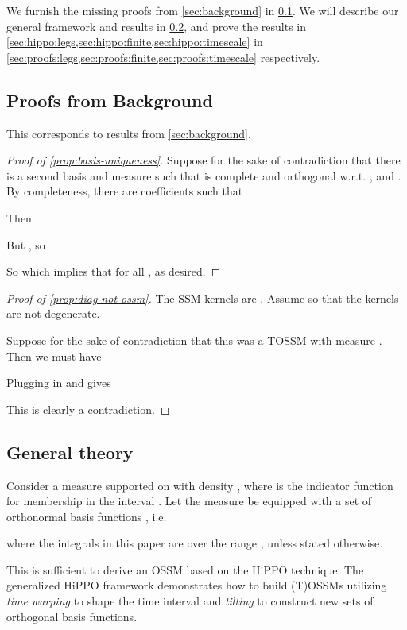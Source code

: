 \documentclass{article}
\begin{document}
We furnish the missing proofs from \cref{sec:background} in \cref{sec:proofs:background}.
We will describe our general framework and results in \cref{sec:proofs:general}, and prove the results in \cref{sec:hippo:legs,sec:hippo:finite,sec:hippo:timescale}
in \cref{sec:proofs:legs,sec:proofs:finite,sec:proofs:timescale} respectively.

\subsection{Proofs from Background}
\label{sec:proofs:background}

This corresponds to results from \cref{sec:background}.

\begin{proof}[Proof of \cref{prop:basis-uniqueness}]Suppose for the sake of contradiction that there is a second basis and measure  such that  is complete and orthogonal w.r.t. , and .
  By completeness, there are coefficients  such that
  
  Then
  
  But , so
  
  So  which implies that  for all , as desired.
\end{proof}

\begin{proof}[Proof of \cref{prop:diag-not-ossm}]The SSM kernels are . Assume  so that the kernels are not degenerate.

  Suppose for the sake of contradiction that this was a TOSSM with measure .
  Then we must have
  
  Plugging in  and  gives
  
  This is clearly a contradiction.
\end{proof}


\subsection{General theory}
\label{sec:proofs:general}



Consider a measure supported on  with density , where  is the indicator function for membership in the  interval . Let the measure be equipped with a set of orthonormal basis functions , i.e.

where the integrals in this paper are over the range , unless stated otherwise. 

This is sufficient to derive an OSSM based on the HiPPO technique. The generalized HiPPO framework demonstrates how to build (T)OSSMs utilizing \emph{time warping} to shape the time interval and \emph{tilting} to construct new sets of orthogonal basis functions. 
\end{document}
